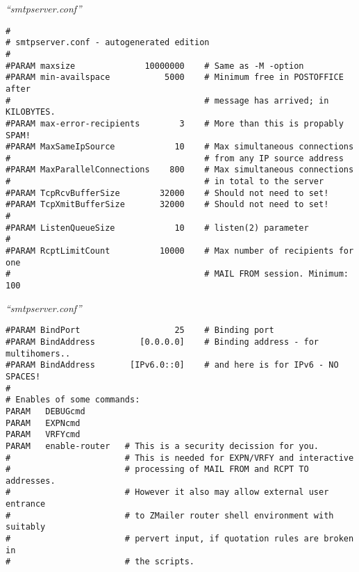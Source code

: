 \documentclass[a4paper,landscape]{slides}
\begin{document}
\begin{overlay}
\small
\centerline{{\em ``smtpserver.conf''}}
\tiny

\begin{verbatim}
#
# smtpserver.conf - autogenerated edition
#
#PARAM maxsize              10000000    # Same as -M -option
#PARAM min-availspace           5000    # Minimum free in POSTOFFICE after
#                                       # message has arrived; in KILOBYTES.
#PARAM max-error-recipients        3    # More than this is propably SPAM!
#PARAM MaxSameIpSource            10    # Max simultaneous connections
#                                       # from any IP source address
#PARAM MaxParallelConnections    800    # Max simultaneous connections
#                                       # in total to the server
#PARAM TcpRcvBufferSize        32000    # Should not need to set!
#PARAM TcpXmitBufferSize       32000    # Should not need to set!
#
#PARAM ListenQueueSize            10    # listen(2) parameter
#
#PARAM RcptLimitCount          10000    # Max number of recipients for one
#                                       # MAIL FROM session. Minimum: 100
\end{verbatim}
\vfill
\end{overlay}
\begin{overlay}
\small
\centerline{{\em ``smtpserver.conf''}}
\tiny
\begin{verbatim}
#PARAM BindPort                   25    # Binding port
#PARAM BindAddress         [0.0.0.0]    # Binding address - for multihomers..
#PARAM BindAddress       [IPv6.0::0]    # and here is for IPv6 - NO SPACES!
#
# Enables of some commands:
PARAM   DEBUGcmd
PARAM   EXPNcmd
PARAM   VRFYcmd
PARAM   enable-router   # This is a security decission for you.
#                       # This is needed for EXPN/VRFY and interactive
#                       # processing of MAIL FROM and RCPT TO addresses.
#                       # However it also may allow external user entrance
#                       # to ZMailer router shell environment with suitably
#                       # pervert input, if quotation rules are broken in
#                       # the scripts.
\end{verbatim}
\vfill
\end{overlay}
\end{document}
